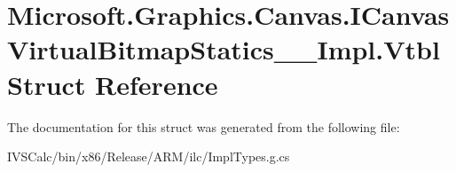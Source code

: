 \hypertarget{struct_microsoft_1_1_graphics_1_1_canvas_1_1_i_canvas_virtual_bitmap_statics_____impl_1_1_vtbl}{}\section{Microsoft.\+Graphics.\+Canvas.\+I\+Canvas\+Virtual\+Bitmap\+Statics\+\_\+\+\_\+\+Impl.\+Vtbl Struct Reference}
\label{struct_microsoft_1_1_graphics_1_1_canvas_1_1_i_canvas_virtual_bitmap_statics_____impl_1_1_vtbl}


The documentation for this struct was generated from the following file\+:\begin{DoxyCompactItemize}
\item 
I\+V\+S\+Calc/bin/x86/\+Release/\+A\+R\+M/ilc/Impl\+Types.\+g.\+cs\end{DoxyCompactItemize}
